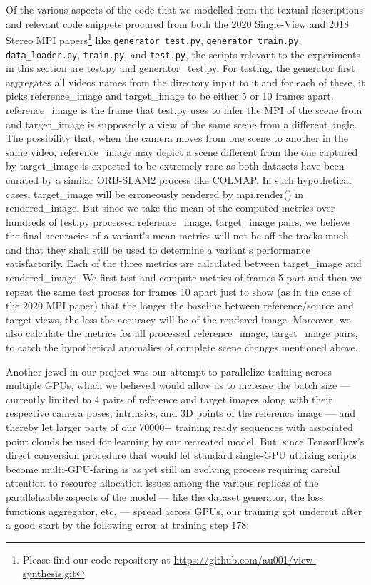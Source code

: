 {\sloppy Of the various aspects of the code that we modelled from the textual descriptions and relevant code snippets procured from both the 2020 Single-View and 2018 Stereo MPI papers\footnote{Please find our code repository at \url{https://github.com/au001/view-synthesis.git}} like \verb`generator_test.py`, \verb`generator_train.py`, \verb`data_loader.py`, \verb`train.py`, and \verb`test.py`, the scripts relevant to the experiments in this section are test.py and generator\_test.py. For testing, the generator first aggregates all videos names from the directory input to it and for each of these, it picks reference\_image and target\_image to be either 5 or 10 frames apart. reference\_image is the frame that test.py uses to infer the MPI of the scene from and target\_image is supposedly a view of the same scene from a different angle. The possibility that, when the camera moves from one scene to another in the same video, reference\_image may depict a scene different from the one captured by target\_image is expected to be extremely rare as both datasets have been curated by a similar ORB-SLAM2 process like COLMAP. In such hypothetical cases, target\_image will be erroneously rendered by mpi.render() in rendered\_image. But since we take the mean of the computed metrics over hundreds of test.py processed reference\_image, target\_image pairs, we believe the final accuracies of a variant's mean metrics will not be off the tracks much and that they shall still be used to determine a variant’s performance satisfactorily. Each of the three metrics are calculated between target\_image and rendered\_image. We first test and compute metrics of frames 5 part and then we repeat the same test process for frames 10 apart just to show (as in the case of the 2020 MPI paper) that the longer the baseline between reference/source and target views, the less the accuracy will be of the rendered image. Moreover, we also calculate the metrics for all processed reference\_image, target\_image pairs, to catch the hypothetical anomalies of complete scene changes mentioned above.}  

Another jewel in our project was our attempt to parallelize training across multiple GPUs, which we believed would allow us to increase the batch size --- currently limited to 4 pairs of reference and target images along with their respective camera poses, intrinsics, and 3D points of the reference image --- and thereby let larger parts of our 70000+ training ready sequences with associated point clouds be used for learning by our recreated model. But, since TensorFlow's direct conversion procedure that would let standard single-GPU utilizing scripts become multi-GPU-faring is as yet still an evolving process requiring careful attention to resource allocation issues among the various replicas of the parallelizable aspects of the model --- like the dataset generator, the loss functions aggregator, etc. --- spread across GPUs, our training got undercut after a good start by the following error at training step 178: 

